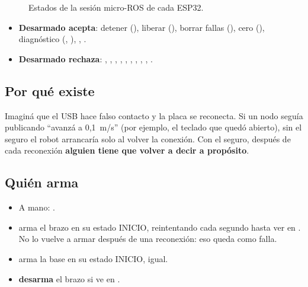 \begin{figure}[H]
\centering
{}
\caption{Estados de la sesión micro-ROS de cada ESP32.}
\label{fig:armar}
\end{figure}

\begin{itemize}
  \item \textbf{Desarmado acepta}: detener (), liberar (), borrar fallas (), cero (),
        diagnóstico (, ), , .
  \item \textbf{Desarmado rechaza}: , , , , , , ,
        , , .
\end{itemize}

\subsection{Por qué existe}
Imaginá que el USB hace falso contacto y la placa se reconecta. Si un nodo seguía publicando ``avanzá a 0,1~m/s''
(por ejemplo, el teclado que quedó abierto), sin el seguro el robot arrancaría solo al volver la conexión. Con el
seguro, después de cada reconexión \textbf{alguien tiene que volver a decir  a propósito}.

\subsection{Quién arma}
\begin{itemize}
  \item A mano:  .
  \item {} arma el brazo en su estado INICIO, reintentando cada segundo hasta ver  en
        . No lo vuelve a armar después de una reconexión: eso queda como falla.
  \item {} arma la base en su estado INICIO, igual.
  \item {} \textbf{desarma} el brazo si ve  en .
\end{itemize}

